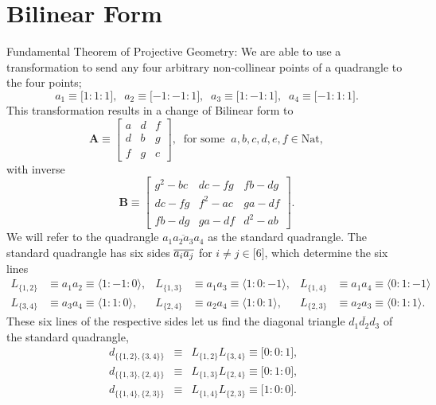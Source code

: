 \documentclass[11pt]{article}
\begin{document}
\author{Sebastian Blefari}
\date{}

\section{Bilinear Form}

Fundamental Theorem of Projective Geometry:\newline
We are able to use a transformation to send any four arbitrary non-collinear
points of a quadrangle to the four points; 
\begin{equation*}
a_{1}\equiv \lbrack 1:1:1],\;\;a_{2}\equiv \lbrack -1:-1:1],\;\;a_{3}\equiv
\lbrack 1:-1:1],\;\;a_{4}\equiv \lbrack -1:1:1].
\end{equation*}%
This transformation results in a change of Bilinear form to 
\begin{equation*}
\mathbf{A}\equiv 
\begin{bmatrix}
a & d & f \\ 
d & b & g \\ 
f & g & c%
\end{bmatrix}%
,\;\;\text{for some}\;\;a,b,c,d,e,f\in \text{Nat},
\end{equation*}%
with inverse 
\begin{equation*}
\mathbf{B}\equiv 
\begin{bmatrix}
g^{2}-bc & dc-fg & fb-dg \\ 
dc-fg & f^{2}-ac & ga-df \\ 
fb-dg & ga-df & d^{2}-ab%
\end{bmatrix}%
.
\end{equation*}%
We will refer to the quadrangle $\overline{a_{1}a_{2}a_{3}a_{4}}$ as the
standard quadrangle. The standard quadrangle has six sides $\overline{%
a_{i}a_{j}}$ for $i\neq j\in \lbrack 6]$, which determine the six lines 
\begin{align*}
L_{\{1,2\}}& \equiv a_{1}a_{2}\equiv \langle 1:-1:0\rangle , & L_{\{1,3\}}&
\equiv a_{1}a_{3}\equiv \langle 1:0:-1\rangle , & L_{\{1,4\}}& \equiv
a_{1}a_{4}\equiv \langle 0:1:-1\rangle \\
L_{\{3,4\}}& \equiv a_{3}a_{4}\equiv \langle 1:1:0\rangle , & L_{\{2,4\}}&
\equiv a_{2}a_{4}\equiv \langle 1:0:1\rangle , & L_{\{2,3\}}& \equiv
a_{2}a_{3}\equiv \langle 0:1:1\rangle .
\end{align*}%
These six lines of the respective sides let us find the diagonal triangle $%
\overline{d_{1}d_{2}d_{3}}$ of the standard quadrangle, 
\begin{eqnarray*}
d_{\{\{1,2\},\{3,4\}\}} &\equiv &L_{\{1,2\}}L_{\{3,4\}}\equiv \lbrack
0:0:1],\;\; \\
d_{\{\{1,3\},\{2,4\}\}} &\equiv &L_{\{1,3\}}L_{\{2,4\}}\equiv \lbrack
0:1:0],\;\; \\
d_{\{\{1,4\},\{2,3\}\}} &\equiv &L_{\{1,4\}}L_{\{2,3\}}\equiv \lbrack 1:0:0].
\end{eqnarray*}%
\end{document}
